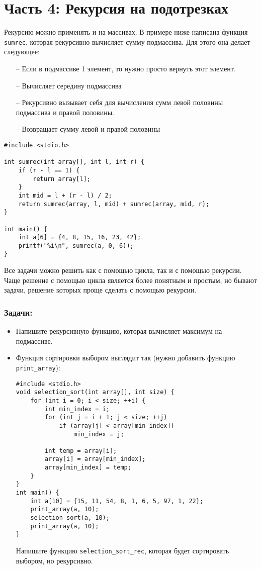 \documentclass{article}
\begin{document}
\section*{Часть 4: Рекурсия на подотрезках}
Рекурсию можно применять и на массивах. В примере ниже написана функция \texttt{sumrec}, которая рекурсивно вычисляет сумму подмассива. Для этого она делает следующее:
\begin{itemize}
\item[--] Если в подмассиве 1 элемент, то нужно просто вернуть этот элемент.
\item[--] Вычисляет середину подмассива
\item[--] Рекурсивно вызывает себя для вычисления сумм левой половины подмассива и правой половины.
\item[--] Возвращает сумму левой и правой половины 
\end{itemize}
\begin{lstlisting}
#include <stdio.h>

int sumrec(int array[], int l, int r) {
    if (r - l == 1) {
        return array[l];
    }
    int mid = l + (r - l) / 2;
    return sumrec(array, l, mid) + sumrec(array, mid, r); 
}

int main() {
    int a[6] = {4, 8, 15, 16, 23, 42};
    printf("%i\n", sumrec(a, 0, 6));
}
\end{lstlisting}
Все задачи можно решить как с помощью цикла, так и с помощью рекурсии. Чаще решение с помощью цикла является более понятным и простым, но бывают задачи, решение которых проще сделать с помощью рекурсии.
\subsubsection*{Задачи:}
\begin{itemize}
\item Напишите рекурсивную функцию, которая вычисляет максимум на подмассиве.

\item Функция сортировки выбором выглядит так (нужно добавить функцию \texttt{print\_array}):
\begin{lstlisting}
#include <stdio.h>
void selection_sort(int array[], int size) {
    for (int i = 0; i < size; ++i) {
        int min_index = i;
        for (int j = i + 1; j < size; ++j)
            if (array[j] < array[min_index])
                min_index = j;
        
        int temp = array[i];
        array[i] = array[min_index];
        array[min_index] = temp;
    }
}
int main() {
    int a[10] = {15, 11, 54, 8, 1, 6, 5, 97, 1, 22};
    print_array(a, 10);
    selection_sort(a, 10);
    print_array(a, 10);
}
\end{lstlisting}
Напишите функцию \texttt{selection\_sort\_rec}, которая будет сортировать выбором, но рекурсивно.
\end{itemize}
\newpage
\end{document}
